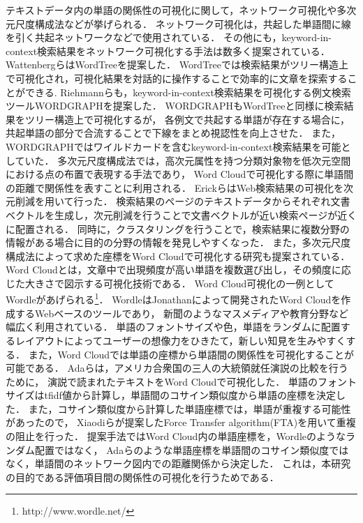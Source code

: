 \documentclass[syuuron]{kuee}
\begin{document}
		テキストデータ内の単語の関係性の可視化に関して，ネットワーク可視化や多次元尺度構成法などが挙げられる．
		ネットワーク可視化は，共起した単語間に線を引く共起ネットワークなどで使用されている．
		その他にも，keyword-in-context検索結果をネットワーク可視化する手法は数多く提案されている．
		WattenbergらはWordTreeを提案した\cite{wt1}．
		WordTreeでは検索結果がツリー構造上で可視化され，可視化結果を対話的に操作することで効率的に文章を探索することができる.
		Riehmannらも，keyword-in-context検索結果を可視化する例文検索ツールWORDGRAPHを提案した\cite{wg1}．
		WORDGRAPHもWordTreeと同様に検索結果をツリー構造上で可視化するが，
		各例文で共起する単語が存在する場合に，共起単語の部分で合流することで下線をまとめ視認性を向上させた．
		また，WORDGRAPHではワイルドカードを含むkeyword-in-context検索結果を可能としていた．		
		多次元尺度構成法では，高次元属性を持つ分類対象物を低次元空間における点の布置で表現する手法であり，
		Word Cloudで可視化する際に単語間の距離で関係性を表すことに利用される\cite{wc2}．
		ErickらはWeb検索結果の可視化を次元削減を用いて行った\cite{or1}．
		検索結果のページのテキストデータからそれぞれ文書ベクトルを生成し，次元削減を行うことで文書ベクトルが近い検索ページが近くに配置される．
		同時に，クラスタリングを行うことで，検索結果に複数分野の情報がある場合に目的の分野の情報を発見しやすくなった．
		また，多次元尺度構成法によって求めた座標をWord Cloudで可視化する研究も提案されている．
		Word Cloudとは，文章中で出現頻度が高い単語を複数選び出し，その頻度に応じた大きさで図示する可視化技術である\cite{wc1}．
		Word Cloud可視化の一例としてWordleがあげられる\footnote{http://www.wordle.net/}．
		WordleはJonathanによって開発されたWord Cloudを作成するWebベースのツールであり，
		新聞のようなマスメディアや教育分野など幅広く利用されている\cite{wc2}．
		単語のフォントサイズや色，単語をランダムに配置するレイアウトによってユーザーの想像力をひきたて，新しい知見を生みやすくする．
		また，Word Cloudでは単語の座標から単語間の関係性を可視化することが可能である．
		Adaらは，アメリカ合衆国の三人の大統領就任演説の比較を行うために，
		演説で読まれたテキストをWord Cloudで可視化した\cite{fta2}．
		単語のフォントサイズはtfidf値から計算し，単語間のコサイン類似度から単語の座標を決定した．
		また，コサイン類似度から計算した単語座標では，単語が重複する可能性があったので，
		Xiaodiらが提案したForce Transfer algorithm(FTA)を用いて重複の阻止を行った\cite{fta1}．
		提案手法ではWord Cloud内の単語座標を，Wordleのようなランダム配置ではなく，
		Adaらのような単語座標を単語間のコサイン類似度ではなく，単語間のネットワーク図内での距離関係から決定した．
		これは，本研究の目的である評価項目間の関係性の可視化を行うためである．
\end{document}
